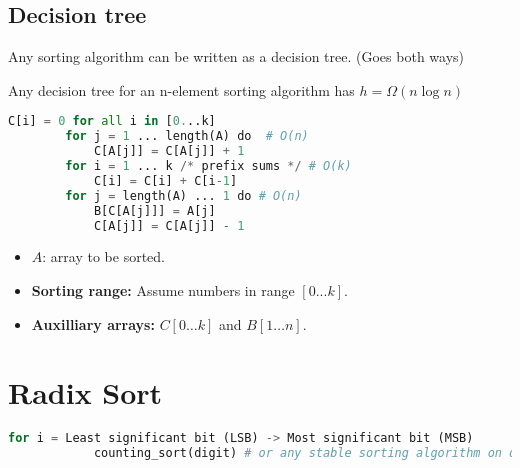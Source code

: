 \documentclass{article}
\begin{document}
\subsection{Decision tree}
\begin{definition}
    Any sorting algorithm can be written as a decision tree. (Goes both ways)
\end{definition}

\begin{theorem}
    Any decision tree for an n-element sorting algorithm has $h=\Omega (n\log n)$
\end{theorem}

\begin{algo}
    \begin{lstlisting}[language=Python]
        C[i] = 0 for all i in [0...k]
        for j = 1 ... length(A) do  # O(n)
            C[A[j]] = C[A[j]] + 1
        for i = 1 ... k /* prefix sums */ # O(k)
            C[i] = C[i] + C[i-1]
        for j = length(A) ... 1 do # O(n)
            B[C[A[j]]] = A[j]
            C[A[j]] = C[A[j]] - 1 
    \end{lstlisting}
    \begin{itemize}
        \item $A$: array to be sorted. 
        \item \textbf{Sorting range:} Assume numbers in range $[0...k]$. 
        \item \textbf{Auxilliary arrays:} $C [0\ldots k]$ and $B [1 \ldots n]$.
    \end{itemize}
\end{algo}


\newpage

\section{Radix Sort}
\begin{summary}
    
\end{summary}

\begin{algo}
    \begin{lstlisting}[language=Python]
        for i = Least significant bit (LSB) -> Most significant bit (MSB)
            counting_sort(digit) # or any stable sorting algorithm on digit i
    \end{lstlisting}
\end{algo}
\end{document}
